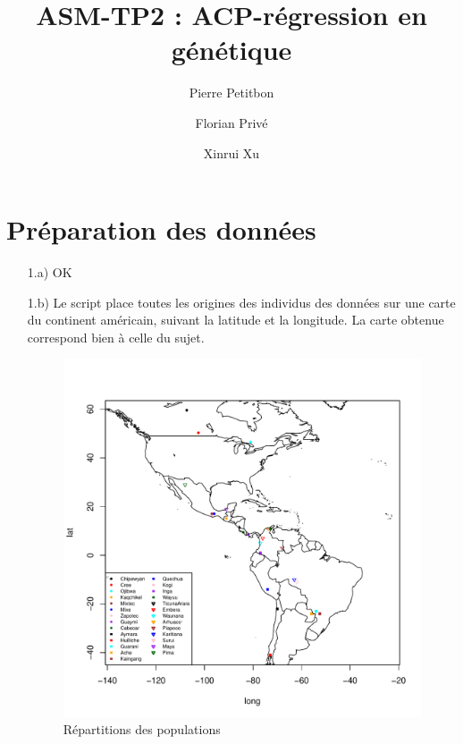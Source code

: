 \documentclass[a4paper, 12pt]{article}
\title{ASM-TP2 : ACP-régression en génétique}
\author{Pierre Petitbon \and Florian Privé \and Xinrui Xu}
\date{}
\begin{document}
\maketitle

\section{Préparation des données}

\begin{enumerate}
\setlength{\itemsep}{20pt}

\item[1.a)] 
	OK

\item[1.b)]
Le script place toutes les origines des individus des données sur une carte du continent américain, suivant la latitude et la longitude. La carte obtenue correspond bien à celle du sujet. 

\begin{figure}[!h]
\begin{center}
\includegraphics[scale=1]{map.pdf}
\caption{Répartitions des populations}
\end{center}
\end{figure}

\end{enumerate}
\end{document}
